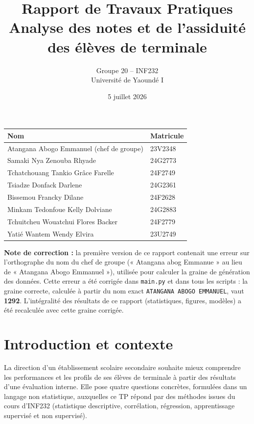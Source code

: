 \documentclass[11pt,a4paper]{article}
\title{\textbf{Rapport de Travaux Pratiques\\Analyse des notes et de l'assiduité des élèves de terminale}}
\author{Groupe 20 -- INF232\\Université de Yaoundé I}
\date{5 juillet 2026}
\begin{document}
\maketitle
\thispagestyle{empty}

\begin{center}
\begin{tabular}{|l|l|}
\hline
\textbf{Nom} & \textbf{Matricule} \\
\hline
Atangana Abogo Emmanuel (chef de groupe) & 23V2348 \\
Samaki Nya Zenouba Rhyade & 24G2773 \\
Tchatchouang Tankio Grâce Farelle & 24F2749 \\
Tsiadze Donfack Darlene & 24G2361 \\
Bissemou Francky Dilane & 24F2628 \\
Minkam Tedonfoue Kelly Dolviane & 24G2883 \\
Tchuitcheu Wouatchui Flores Backer & 24F2779 \\
Yatié Wantem Wendy Elvira & 23U2749 \\
\hline
\end{tabular}
\end{center}

\vspace{0.5cm}
\noindent\textbf{Note de correction :} la première version de ce rapport contenait une
erreur sur l'orthographe du nom du chef de groupe (« Atangana abog Emmanue » au lieu de
« Atangana Abogo Emmanuel »), utilisée pour calculer la graine de génération des données.
Cette erreur a été corrigée dans \texttt{main.py} et dans tous les scripts : la graine
correcte, calculée à partir du nom exact \texttt{ATANGANA ABOGO EMMANUEL}, vaut
\textbf{1292}. L'intégralité des résultats de ce rapport (statistiques, figures, modèles)
a été recalculée avec cette graine corrigée.

\newpage
\tableofcontents
\newpage

\section{Introduction et contexte}

La direction d'un établissement scolaire secondaire souhaite mieux comprendre les
performances et les profils de ses élèves de terminale à partir des résultats d'une
évaluation interne. Elle pose quatre questions concrètes, formulées dans un langage non
statistique, auxquelles ce TP répond par des méthodes issues du cours d'INF232
(statistique descriptive, corrélation, régression, apprentissage supervisé et non
supervisé).
\end{document}
